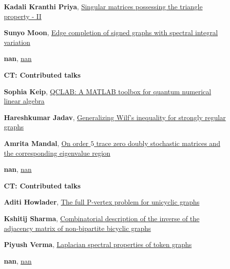 \documentclass[ILAS2025-program.tex]{subfiles}
\begin{document}
\begin{description}
\begin{description}
        \item[] \hypertarget{up0085}{}\textbf{Kadali Kranthi Priya}, \hyperlink{down0085}{Singular matrices possessing the triangle property - II}
        \item[] \hypertarget{up0086}{}\textbf{Sunyo Moon}, \hyperlink{down0086}{Edge completion of signed graphs with spectral integral variation}
        \item[] \hypertarget{up0087}{}\textbf{nan}, \hyperlink{down0087}{nan}
        \end{description}
    \begin{description}
    \item[] {\color{mstitle}\textbf{CT: Contributed talks}} 
    \item[] \hypertarget{up0088}{}\textbf{Sophia Keip}, \hyperlink{down0088}{QCLAB: A MATLAB toolbox for quantum numerical linear algebra}
        \item[] \hypertarget{up0089}{}\textbf{Hareshkumar Jadav}, \hyperlink{down0089}{Generalizing Wilf's inequality for strongly regular graphs}
        \item[] \hypertarget{up0090}{}\textbf{Amrita Mandal}, \hyperlink{down0090}{On order $5$ trace zero doubly stochastic matrices and the corresponding eigenvalue region}
        \item[] \hypertarget{up0091}{}\textbf{nan}, \hyperlink{down0091}{nan}
        \end{description}
    \begin{description}
    \item[] {\color{mstitle}\textbf{CT: Contributed talks}} 
    \item[] \hypertarget{up0092}{}\textbf{Aditi Howlader}, \hyperlink{down0092}{The full P-vertex problem for unicyclic graphs}
        \item[] \hypertarget{up0093}{}\textbf{Kshitij Sharma}, \hyperlink{down0093}{Combinatorial description of the inverse of the adjacency matrix of non-bipartite bicyclic graphs}
        \item[] \hypertarget{up0094}{}\textbf{Piyush Verma}, \hyperlink{down0094}{Laplacian spectral properties of token graphs}
        \item[] \hypertarget{up0095}{}\textbf{nan}, \hyperlink{down0095}{nan}

\end{description}
\end{description}
\end{document}

